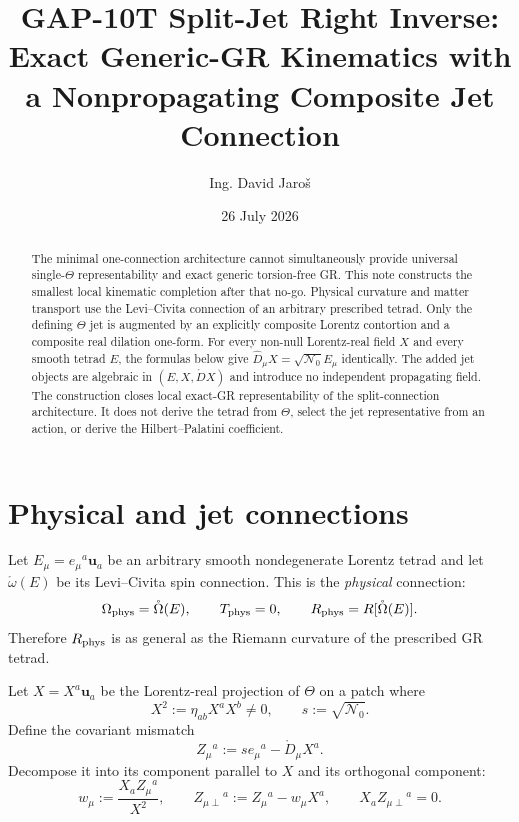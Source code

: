 \documentclass[11pt,a4paper]{article}
\title{GAP-10T Split-Jet Right Inverse:\\
Exact Generic-GR Kinematics with a Nonpropagating Composite Jet Connection}
\author{Ing. David Jaro\v{s}}
\date{26 July 2026}
\begin{document}
\maketitle
\UBTProvenanceNotice

\begin{abstract}
The minimal one-connection architecture cannot simultaneously provide universal
single-$\Theta$ representability and exact generic torsion-free GR.  This note
constructs the smallest local kinematic completion after that no-go.  Physical
curvature and matter transport use the Levi--Civita connection of an arbitrary
prescribed tetrad.  Only the defining $\Theta$ jet is augmented by an explicitly
composite Lorentz contortion and a composite real dilation one-form.  For every
non-null Lorentz-real field $X$ and every smooth tetrad $E$, the formulas below
give $\widehat D_\mu X=\sqrt{\mathcal N_0}E_\mu$ identically.  The added jet
objects are algebraic in $(E,X,\mathring D X)$ and introduce no independent
propagating field.  The construction closes local exact-GR representability of
the split-connection architecture.  It does not derive the tetrad from
$\Theta$, select the jet representative from an action, or derive the
Hilbert--Palatini coefficient.
\end{abstract}

\section{Physical and jet connections}
Let $E_\mu=e_\mu{}^a\mathbf u_a$ be an arbitrary smooth nondegenerate Lorentz
tetrad and let $\mathring\omega(E)$ be its Levi--Civita spin connection.  This
is the \emph{physical} connection:
\begin{equation}
 \Omega_{\rm phys}=\mathring\Omega(E),\qquad T_{\rm phys}=0,
 \qquad R_{\rm phys}=R[\mathring\Omega(E)].
 \label{eq:physical}
\end{equation}
Therefore $R_{\rm phys}$ is as general as the Riemann curvature of the
prescribed GR tetrad.

Let $X=X^a\mathbf u_a$ be the Lorentz-real projection of $\Theta$ on a patch
where
\begin{equation}
 X^2:=\eta_{ab}X^aX^b\ne0,
 \qquad s:=\sqrt{\mathcal N_0}.
\end{equation}
Define the covariant mismatch
\begin{equation}
 Z_\mu{}^a:=s e_\mu{}^a-\mathring D_\mu X^a.
 \label{eq:Z}
\end{equation}
Decompose it into its component parallel to $X$ and its orthogonal component:
\begin{equation}
 w_\mu:=\frac{X_aZ_\mu{}^a}{X^2},
 \qquad
 Z_{\mu\perp}{}^a:=Z_\mu{}^a-w_\mu X^a,
 \qquad X_aZ_{\mu\perp}{}^a=0.
 \label{eq:decomp}
\end{equation}
\end{document}
